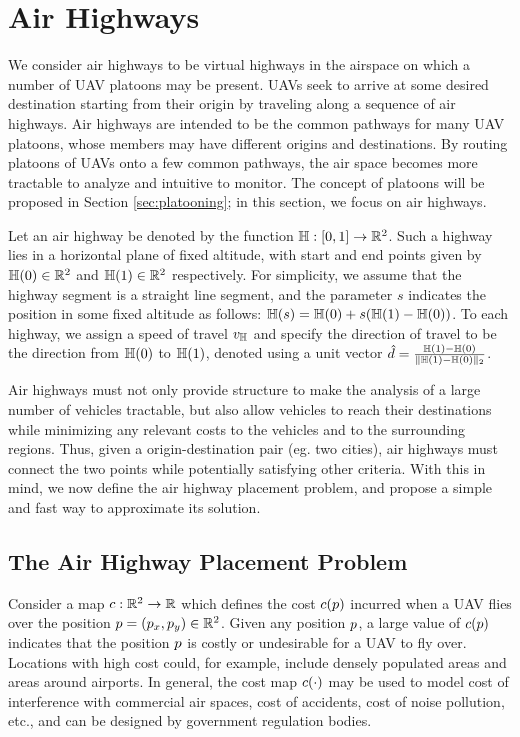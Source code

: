 \section{Air Highways}
We consider air highways to be virtual highways in the airspace on which a number of UAV platoons may be present. UAVs seek to arrive at some desired destination starting from their origin by traveling along a sequence of air highways. Air highways are intended to be the common pathways for many UAV platoons, whose members may have different origins and destinations. By routing platoons of UAVs onto a few common pathways, the air space becomes more tractable to analyze and intuitive to monitor. The concept of platoons will be proposed in Section \ref{sec:platooning}; in this section, we focus on air highways.

Let an air highway be denoted by the function $\mathbb{H}: [0, 1] \rightarrow \mathbb{R}^2$. Such a highway lies in a horizontal plane of fixed altitude, with start and end points given by $\mathbb{H}(0)\in\mathbb{R}^2$ and $\mathbb{H}(1)\in\mathbb{R}^2$ respectively. For simplicity, we assume that the highway segment is a straight line segment, and the parameter $s$ indicates the position in some fixed altitude as follows: $\mathbb{H}(s) = \mathbb{H}(0) + s(\mathbb{H}(1) - \mathbb{H}(0))$. To each highway, we assign a speed of travel $v_{\mathbb{H}}$ and specify the direction of travel to be the direction from $\mathbb{H}(0)$ to $\mathbb{H}(1)$, denoted using a unit vector $\hat{d} = \frac{\mathbb{H}(1) - \mathbb{H}(0)}{\lVert\mathbb{H}(1) - \mathbb{H}(0)\rVert_2}$.

Air highways must not only provide structure to make the analysis of a large number of vehicles tractable, but also allow vehicles to reach their destinations while minimizing any relevant costs to the vehicles and to the surrounding regions. Thus, given a origin-destination pair (eg. two cities), air highways must connect the two points while potentially satisfying other criteria. With this in mind, we now define the air highway placement problem, and propose a simple and fast way to approximate its solution.

\subsection{The Air Highway Placement Problem}
Consider a map $c:\mathbb{R}^2 \rightarrow \mathbb{R}$ which defines the cost $c(p)$ incurred when a UAV flies over the position $p=(p_x,p_y)\in\mathbb{R}^2$. Given any position $p$, a large value of $c(p)$ indicates that the position $p$ is costly or undesirable for a UAV to fly over. Locations with high cost could, for example, include densely populated areas and areas around airports. In general, the cost map $c(\cdot)$ may be used to model cost of interference with commercial air spaces, cost of accidents, cost of noise pollution, etc., and can be designed by government regulation bodies.

